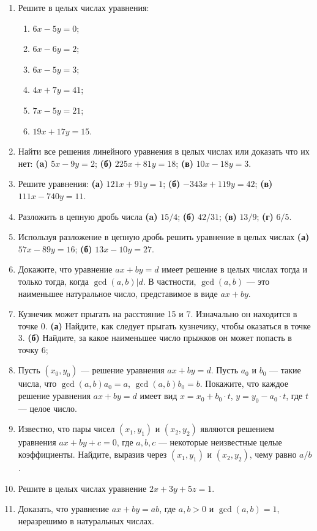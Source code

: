 \begin{enumerate}
\item Решите в целых числах уравнения:
\begin{enumerate}
\item $6x-5y = 0$;
\item $6x-6y = 2$;
\item $6x - 5y = 3$;
\item $4x + 7y = 41$;
\item $7x - 5y = 21$;
\item $19x + 17y = 15$.
\end{enumerate}


\item Найти все решения линейного уравнения в целых числах или доказать что их нет:
\textbf{(a)} $5x-9y=2$; \textbf{(б)} $225x+81y=18$; \textbf{(в)} $10x-18y=3$.

\item Решите уравнения: \textbf{(а)} $121x + 91y = 1$; \textbf{(б)} $-343x + 119y = 42$;
\textbf{(в)} $111x - 740y = 11$.

\item Разложить в цепную дробь числа \textbf{(a)} $15/4$; \textbf{(б)} $42/31$; \textbf{(в)} $13/9$;
\textbf{(г)} $6/5$.

\item Используя разложение в цепную дробь решить уравнение в целых числах
\textbf{(а)} $57x - 89y = 16$; \textbf{(б)} $13x - 10y = 27$.

\item Докажите, что уравнение $ax + by = d$ имеет решение в целых
числах тогда и только тогда, когда $\gcd(a, b)|d$. В частности,
$\gcd(a, b)$ --- это наименьшее натуральное число, представимое в
виде $ax + by$.

\item Кузнечик может прыгать на расстояние 15 и 7. Изначально он
находится в точке 0. \textbf{(а)} Найдите, как следует прыгать кузнечику,
чтобы оказаться в точке 3. \textbf{(б)} Найдите, за какое наименьшее число
прыжков он может попасть в точку 6;

\item Пусть $(x_0, y_0)$ --- решение уравнения $ax + by = d$. Пусть $a_0$ и $b_0$
--- такие числа, что $\gcd(a, b)a_0 = a$, $\gcd(a, b)b_0 = b$. Покажите,
что каждое решение уравнения $ax + by = d$ имеет вид $x = x_0 + b_0 \cdot t$,
$y = y_0 - a_0 \cdot t$, где $t$ --- целое число.

\item Известно, что пары чисел $(x_1 , y_1)$ и $(x_2 , y_2)$ являются решением
 уравнения $ax + by + c = 0$, где $a, b, c$ --- некоторые неизвестные
целые коэффициенты. Найдите, выразив через $(x_1, y_1)$ и $(x_2, y_2)$,
чему равно $a/b$.

\item Решите в целых числах уравнение $2x + 3y + 5z = 1$.

\item Доказать, что уравнение $ax+by=ab$, где $a,b>0$ и $\gcd(a,b)=1$, неразрешимо в натуральных числах.
\end{enumerate}





